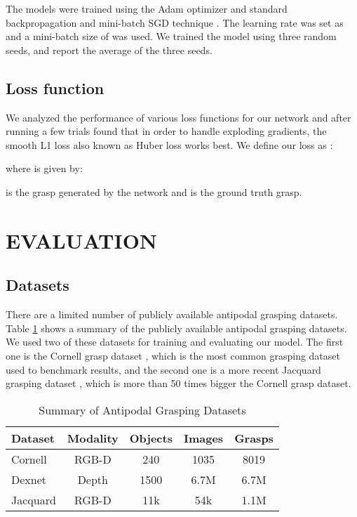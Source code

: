 \documentclass[letterpaper, 10pt, conference]{IEEEtran}
\begin{document}
The models were trained using the Adam optimizer \cite{adam2015} and standard backpropagation and mini-batch SGD technique \cite{nitanda2014stochastic}. The learning rate was set as  and a mini-batch size of  was used. We trained the model using three random seeds, and report the average of the three seeds. 

\subsection{Loss function}
We analyzed the performance of various loss functions for our network and after running a few trials found that in order to handle exploding gradients, the smooth L1 loss also known as Huber loss works best. We define our loss as :

where  is given by:

 is the grasp generated by the network and  is the ground truth grasp.



\section{EVALUATION}

\subsection{Datasets}
There are a limited number of publicly available antipodal grasping datasets. Table \ref{tab:datasets} shows a summary of the publicly available antipodal grasping datasets. We used two of these datasets for training and evaluating our model. The first one is the Cornell grasp dataset \cite{jiang2011efficient}, which is the most common grasping dataset used to benchmark results, and the second one is a more recent Jacquard grasping dataset \cite{depierre2018jacquard}, which is more than 50 times bigger the Cornell grasp dataset.

\begin{table}[htbp]
\vspace{2mm}
\begin{center}
\caption{Summary of Antipodal Grasping Datasets}
\label{tab:datasets}
\begin{tabular}{l|c|c|c|c}
\hline
\textbf{Dataset} & \textbf{Modality} & \textbf{Objects} & \textbf{Images} & \textbf{Grasps} \\
\hline
Cornell & RGB-D & 240 & 1035 & 8019 \\
Dexnet & Depth & 1500 & 6.7M & 6.7M \\
Jacquard & RGB-D & 11k & 54k & 1.1M \\
\hline
\end{tabular}
\end{center}
\end{table}
\end{document}

